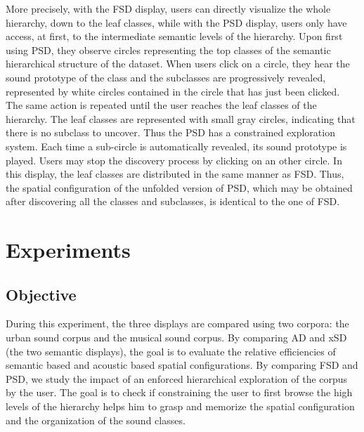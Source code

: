 \documentclass{aes2e}
\newcommand{\mr}[1]{\textcolor{green}{Mathias : #1}}
\begin{document}
More precisely, with the FSD display, users can directly visualize the whole hierarchy, down to the leaf classes, while with the PSD display, users only have access, at first, to the intermediate semantic levels of the hierarchy. Upon first using PSD, they observe circles representing the top classes of the semantic hierarchical structure of the dataset. When users click on a circle, they hear the sound prototype of the class and the subclasses are progressively revealed, represented by white circles contained in the circle that has just been clicked. The same action is repeated until the user reaches the leaf classes of the hierarchy. The leaf classes are represented with small gray circles, indicating that there is no subclass to uncover. Thus the PSD has a constrained exploration system. Each time a sub-circle is automatically revealed, its sound prototype is played. Users may stop the discovery process by clicking on an other circle. In this display, the leaf classes are distributed  in the same manner as FSD. Thus, the spatial configuration of the unfolded version of PSD, which may be obtained after discovering all the classes and subclasses, is identical to the one of FSD.


\section{Experiments} \label{test}

\subsection{Objective}

During this experiment, the three displays are compared using two corpora: the urban sound corpus and the musical sound corpus. By comparing AD and xSD (the two semantic displays), the goal is to evaluate the  relative efficiencies of semantic based and acoustic based spatial configurations. By comparing FSD and PSD, we study the impact of an enforced hierarchical exploration of the corpus by the user. The goal is to check if constraining the user to first browse the high levels of the hierarchy helps him to grasp and memorize the spatial configuration and the organization of the sound classes. 
\end{document}
